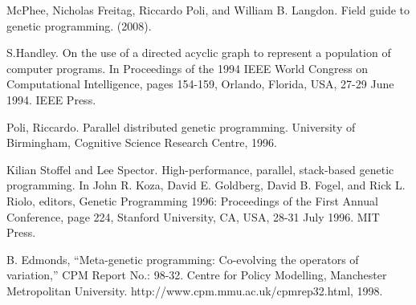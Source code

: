 \documentclass[12pt,conference]{IEEEtran}
\begin{document}
	\begin{thebibliography}{00}
				
		 McPhee, Nicholas Freitag, Riccardo Poli, and William B. Langdon. Field
		guide to genetic programming. (2008).
		
		 S.Handley. On the use of a directed acyclic graph to represent a population of computer programs. In Proceedings of the 1994 IEEE World Congress on Computational Intelligence, pages 154-159, Orlando, Florida, USA, 27-29 June 1994. IEEE Press.

		 Poli, Riccardo. Parallel distributed genetic programming. University of Birmingham, Cognitive Science Research Centre, 1996.

		 Kilian Stoffel and Lee Spector. High-performance, parallel, stack-based genetic programming. In John R. Koza, David E. Goldberg, David B. Fogel, and Rick L. Riolo, editors, Genetic Programming 1996: Proceedings of the First Annual Conference, page 224, Stanford University, CA, USA, 28-31 July 1996. MIT Press.
			
		 B. Edmonds, “Meta-genetic programming: Co-evolving the operators of variation,” CPM Report No.: 98-32. Centre for Policy Modelling, Manchester Metropolitan University. http://www.cpm.mmu.ac.uk/cpmrep32.html, 1998.
		\end{thebibliography}
	
\end{document}
